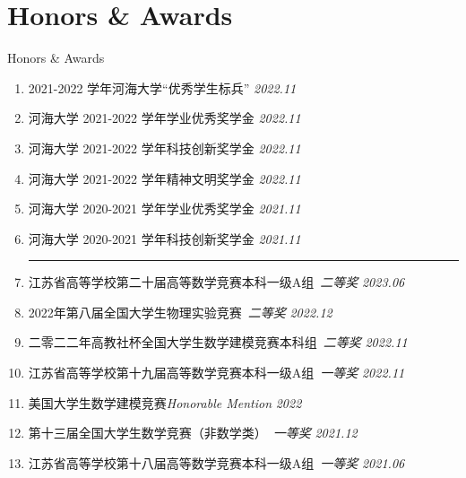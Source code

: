 \documentclass[9pt,aspectratio=169,hyperref=colorlinks]{beamer}
\begin{document}
\section{Honors \& Awards}
\begin{frame}{Honors \& Awards}
    \begin{enumerate}
        \item 2021-2022 学年河海大学“优秀学生标兵” \hfill \textit{2022.11}
        \item 河海大学 2021-2022 学年学业优秀奖学金 \hfill \textit{2022.11}
        \item 河海大学 2021-2022 学年科技创新奖学金 \hfill \textit{2022.11}
        \item 河海大学 2021-2022 学年精神文明奖学金 \hfill \textit{2022.11}
        \item 河海大学 2020-2021 学年学业优秀奖学金 \hfill \textit{2021.11}
        \item 河海大学 2020-2021 学年科技创新奖学金 \hfill \textit{2021.11}

              \medskip \hrule \medskip

        \item 江苏省高等学校第二十届高等数学竞赛本科一级A组\ \textit{二等奖} \hfill \textit{2023.06}
        \item 2022年第八届全国大学生物理实验竞赛\ \textit{二等奖}  \hfill \textit{2022.12}
        \item 二零二二年高教社杯全国大学生数学建模竞赛本科组\ \textit{二等奖} \hfill \textit{2022.11}
        \item 江苏省高等学校第十九届高等数学竞赛本科一级A组\ \textit{一等奖} \hfill \textit{2022.11}
        \item 美国大学生数学建模竞赛\textit{Honorable Mention} \hfill \textit{2022}
        \item 第十三届全国大学生数学竞赛（非数学类）\ \textit{一等奖} \hfill \textit{2021.12}
        \item 江苏省高等学校第十八届高等数学竞赛本科一级A组\ \textit{一等奖} \hfill \textit{2021.06}
    \end{enumerate}
\end{frame}
\end{document}

